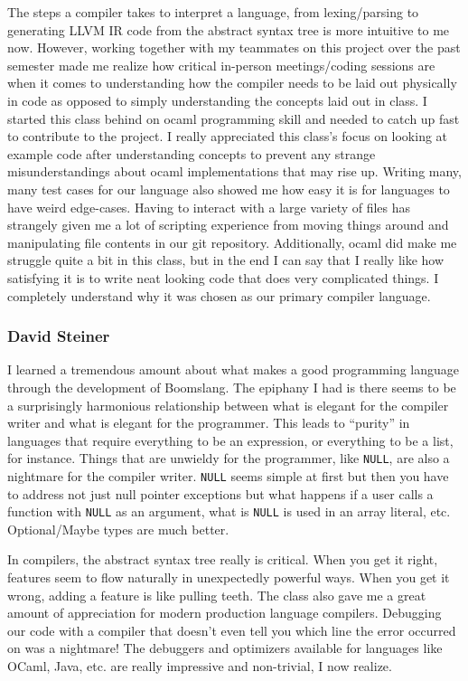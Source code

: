 \documentclass{article}
\begin{document}
The steps a compiler takes to interpret a language, from lexing/parsing to generating LLVM IR code from the abstract syntax tree is more intuitive to me now.  However, working together with my teammates on this project over the past semester made me realize how critical in-person meetings/coding sessions are when it comes to understanding how the compiler needs to be laid out physically in code as opposed to simply understanding the concepts laid out in class.  I started this class behind on ocaml programming skill and needed to catch up fast to contribute to the project.  I really appreciated this class's focus on looking at example code after understanding concepts to prevent any strange misunderstandings about ocaml implementations that may rise up.  Writing many, many test cases for our language also showed me how easy it is for languages to have weird edge-cases.  Having to interact with a large variety of files has strangely given me a lot of scripting experience from moving things around and manipulating file contents in our git repository.  Additionally, ocaml did make me struggle quite a bit in this class, but in the end I can say that I really like how satisfying it is to write neat looking code that does very complicated things.  I completely understand why it was chosen as our primary compiler language.  

\subsubsection{David Steiner}
I learned a tremendous amount about what makes a good programming language through the development of Boomslang. The epiphany I had is there seems to be a surprisingly harmonious relationship between what is elegant for the compiler writer and what is elegant for the programmer. This leads to ``purity'' in languages that require everything to be an expression, or everything to be a list, for instance. Things that are unwieldy for the programmer, like \texttt{NULL}, are also a nightmare for the compiler writer. \texttt{NULL} seems simple at first but then you have to address not just null pointer exceptions but what happens if a user calls a function with \texttt{NULL} as an argument, what is \texttt{NULL} is used in an array literal, etc. Optional/Maybe types are much better.

In compilers, the abstract syntax tree really is critical. When you get it right, features seem to flow naturally in unexpectedly powerful ways. When you get it wrong, adding a feature is like pulling teeth. The class also gave me a great amount of appreciation for modern production language compilers. Debugging our code with a compiler that doesn't even tell you which line the error occurred on was a nightmare! The debuggers and optimizers available for languages like OCaml, Java, etc. are really impressive and non-trivial, I now realize.
\end{document}
